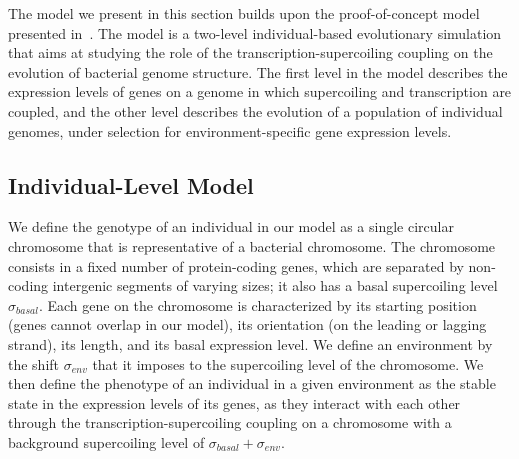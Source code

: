 The model we present in this section builds upon the proof-of-concept model presented in~\cite{grohens2021}.
The model is a two-level individual-based evolutionary simulation that aims at studying the role of the transcription-supercoiling coupling on the evolution of bacterial genome structure.
The first level in the model describes the expression levels of genes on a genome in which supercoiling and transcription are coupled, and the other level describes the evolution of a population of individual genomes, under selection for environment-specific gene expression levels.

\subsection{Individual-Level Model}
\label{sec:indiv_model}

We define the genotype of an individual in our model as a single circular chromosome that is representative of a bacterial chromosome.
The chromosome consists in a fixed number of protein-coding genes, which are separated by non-coding intergenic segments of varying sizes; it also has a basal supercoiling level $\sigma_{basal}$.
Each gene on the chromosome is characterized by its starting position (genes cannot overlap in our model), its orientation (on the leading or lagging strand), its length, and its basal expression level.
We define an environment by the shift $\sigma_{env}$ that it imposes to the supercoiling level of the chromosome.
We then define the phenotype of an individual in a given environment as the stable state in the expression levels of its genes, as they interact with each other through the transcription-supercoiling coupling on a chromosome with a background supercoiling level of $\sigma_{basal} + \sigma_{env}$.

